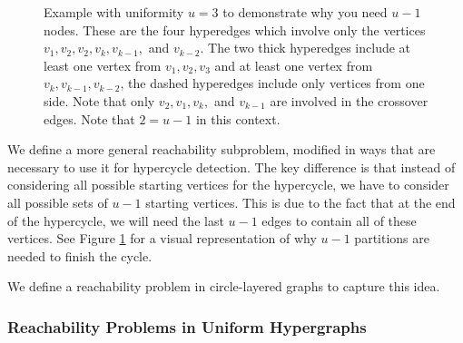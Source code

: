 \documentclass[11pt,letterpaper,pdftex]{article}
\begin{document}
\begin{figure}[ht]
    \centering
    
    \caption{Example with uniformity $u=3$ to demonstrate why you need $u-1$ nodes. These are the four hyperedges which involve only the vertices $v_1,v_2, v_2, v_k, v_{k-1},$ and $v_{k-2}$. The two thick hyperedges include at least one vertex from $v_1, v_2, v_3$ and at least one vertex from $v_k,v_{k-1},v_{k-2}$, the dashed hyperedges include only vertices from one side. Note that only $v_2, v_1, v_k,$ and $v_{k-1}$ are involved in the crossover edges. Note that $2 = u-1$ in this context.}
    \label{fig:reachabilityHypercycle}
\end{figure}


We define a more general reachability subproblem, modified in ways that are necessary to use it for hypercycle detection. 
The key difference is that instead of considering all possible starting vertices for the hypercycle, we have to consider all possible sets of $u-1$ starting vertices.
This is due to the fact that at the end of the hypercycle, we will need the last $u-1$ edges to contain all of these vertices. See Figure \ref{fig:reachabilityHypercycle} for a visual representation of why $u-1$ partitions are needed to finish the cycle. 

We define a reachability problem in circle-layered graphs to capture this idea.

\subsubsection{Reachability Problems in Uniform Hypergraphs}
\end{document}
